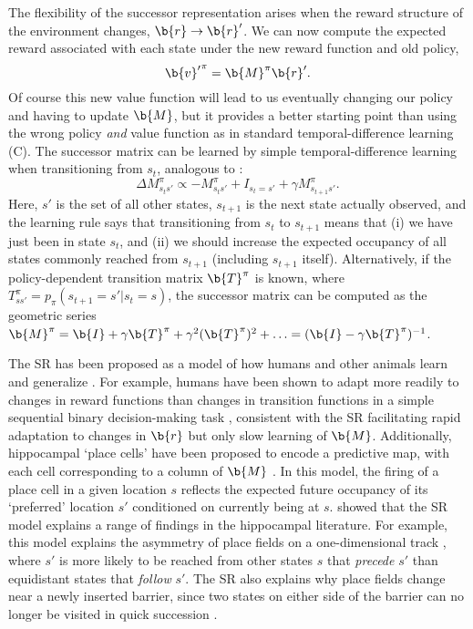 The flexibility of the successor representation arises when the reward structure of the environment changes, $\b{r} \rightarrow \b{r}'$.
We can now compute the expected reward associated with each state under the new reward function and old policy,
\begin{equation}
    {\b{v}'}^\pi = \b{M}^\pi \b{r}'.
\end{equation}
Of course this new value function will lead to us eventually changing our policy and having to update $\b{M}$, but it provides a better starting point than using the wrong policy \emph{and} value function as in standard temporal-difference learning (C).
The successor matrix can be learned by simple temporal-difference learning when transitioning from $s_t$, analogous to :
\begin{equation}
    \Delta M^\pi_{s_t s'} \propto -M^\pi_{s_t s'} + I_{s_t = s'} + \gamma M^\pi_{s_{t+1} s'}.
\end{equation}
Here, ${s'}$ is the set of all other states, $s_{t+1}$ is the next state actually observed, and the learning rule says that transitioning from $s_t$ to $s_{t+1}$ means that (i) we have just been in state $s_t$, and (ii) we should increase the expected occupancy of all states commonly reached from $s_{t+1}$ (including $s_{t+1}$ itself).
Alternatively, if the policy-dependent transition matrix $\b{T}^\pi$ is known, where $T^\pi_{s s'} = p_{\pi}(s_{t+1} = s' | s_t = s)$, the successor matrix can be computed as the geometric series $\b{M}^\pi = \b{I} + \gamma \b{T}^\pi + \gamma^2 (\b{T}^\pi)^2 + \ldots = (\b{I} - \gamma \b{T}^\pi)^{-1}$.

The SR has been proposed as a model of how humans and other animals learn and generalize \citep{momennejad2017successor, stachenfeld2017hippocampus, geerts2020general,gershman2018successor}.
For example, humans have been shown to adapt more readily to changes in reward functions than changes in transition functions in a simple sequential binary decision-making task \citep{momennejad2017successor}, consistent with the SR facilitating rapid adaptation to changes in $\b{r}$ but only slow learning of $\b{M}$.
Additionally, hippocampal `place cells' have been proposed to encode a predictive map, with each cell corresponding to a column of $\b{M}$ \citep{stachenfeld2017hippocampus}.
In this model, the firing of a place cell in a given location $s$ reflects the expected future occupancy of its `preferred' location $s'$ conditioned on currently being at $s$.
\citet{stachenfeld2017hippocampus} showed that the SR model explains a range of findings in the hippocampal literature.
For example, this model explains the asymmetry of place fields on a one-dimensional track \citep{mehta2000experience}, where $s'$ is more likely to be reached from other states $s$ that \emph{precede} $s'$ than equidistant states that \emph{follow} $s'$.
The SR also explains why place fields change near a newly inserted barrier, since two states on either side of the barrier can no longer be visited in quick succession \citep{alvernhe2011local}.

